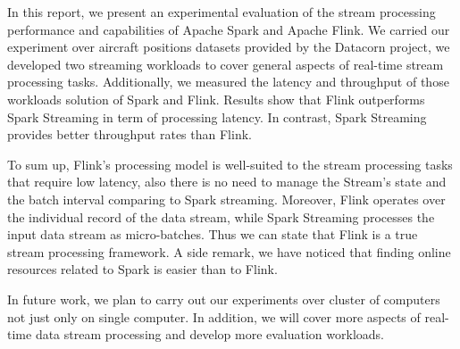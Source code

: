 \documentclass[]{article}
\begin{document}
\label{sec:sec5}
In this report, we present an experimental evaluation of the stream processing performance and capabilities of Apache Spark and Apache Flink. We carried our experiment over aircraft positions datasets provided by the Datacorn project, we developed two streaming workloads to cover general aspects of real-time stream processing tasks. Additionally,  we measured the latency and throughput of those workloads solution of Spark and Flink. Results show that Flink outperforms Spark Streaming in term of processing latency. In contrast, Spark Streaming provides better throughput rates than Flink. 
\par To sum up, Flink's processing model is well-suited to the stream processing tasks that require low latency, also there is no need to manage the Stream's state and the batch interval comparing to Spark streaming. Moreover, Flink operates over the individual record of the data stream, while Spark Streaming  processes the input data stream as micro-batches. Thus we can state that  Flink is a true stream processing framework. A side remark, we have  noticed that finding online resources related to Spark is easier than to Flink.

In future work, we plan to carry out our experiments over cluster of computers not just only on single computer. In addition, we will cover more aspects of real-time data stream processing and develop more evaluation workloads. 
\end{document}
